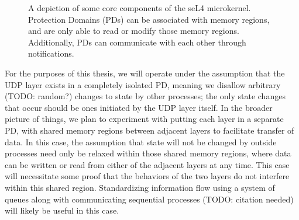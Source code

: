 \documentclass[twoside]{memoir}
\begin{document}
\begin{figure}[h]
    \centering
    \caption{A depiction of some core components of the seL4 microkernel.
    Protection Domains (PDs) can be associated with memory regions,
    and are only able to read or modify those memory regions.
    Additionally, PDs can communicate with each other through notifications.}
    \label{fig:sel4-mem-pd}
\end{figure}

For the purposes of this thesis, we will operate under the assumption that
the UDP layer exists in a completely isolated PD, meaning
we disallow arbitrary (TODO: random?) changes to state by other processes;
the only state changes that occur should be ones initiated by the UDP
layer itself.
In the broader picture of things, we plan to experiment with putting
each layer in a separate PD,
with shared memory regions between adjacent layers to facilitate transfer of data.
In this case, the assumption that state will not be changed by outside processes
need only be relaxed within those shared memory regions, where
data can be written or read from either of the adjacent layers at any time.
This case will necessitate some proof that the behaviors of the two layers
do not interfere within this shared region.
Standardizing information flow using a system of queues along with 
communicating sequential processes (TODO: citation needed)
will likely be useful in this case.
\end{document}
